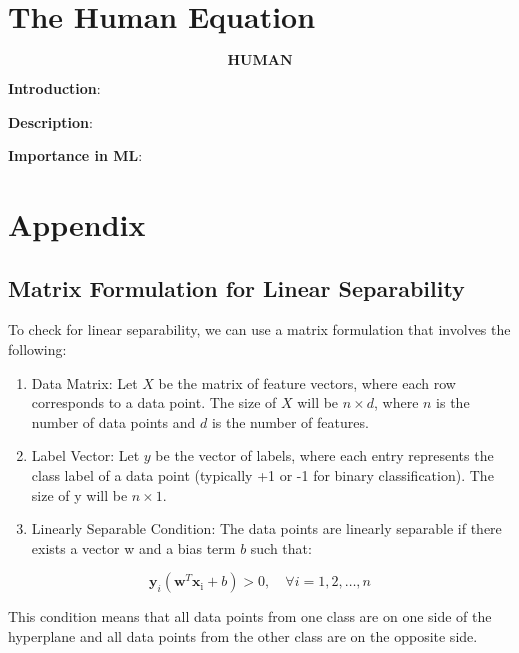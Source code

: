 \documentclass[
  12 pt,
  a4paper,
]{book}
\providecommand{\tightlist}{%
  \setlength{\itemsep}{0pt}\setlength{\parskip}{0pt}}
\numberwithin{equation}{section}
\theoremstyle{plain}      %
\theoremstyle{definition} %
\theoremstyle{remark}     %
\theoremstyle{note}         %
\begin{document}
\newpage

\hypertarget{the-human-equation}{%
\chapter{The Human Equation}\label{the-human-equation}}

\[
\textbf{HUMAN}
\]

\textbf{Introduction}:

\textbf{Description}:

\textbf{Importance in ML}:

\newpage

\backmatter

\hypertarget{appendix}{%
\chapter{Appendix}\label{appendix}}

\hypertarget{matrix-formulation-for-linear-separability}{%
\section*{Matrix Formulation for Linear
Separability}\label{matrix-formulation-for-linear-separability}}

To check for linear separability, we can use a matrix formulation that
involves the following:

\begin{enumerate}
\def\labelenumi{\arabic{enumi}.}
\tightlist
\item
  Data Matrix: Let \(X\) be the matrix of feature vectors, where each
  row corresponds to a data point. The size of \(X\) will be
  \(n \times d\), where \(n\) is the number of data points and \(d\) is
  the number of features.
\item
  Label Vector: Let \(y\) be the vector of labels, where each entry
  represents the class label of a data point (typically +1 or -1 for
  binary classification). The size of y will be \(n \times 1\).
\item
  Linearly Separable Condition: The data points are linearly separable
  if there exists a vector w and a bias term \(b\) such that:
\end{enumerate}

\[
\mathbf{y}_i\left(\mathbf{w}^T \mathbf{x}_{\mathrm{i}}+b\right)>0, \quad \forall i=1,2, \ldots, n
\]

This condition means that all data points from one class are on one side
of the hyperplane and all data points from the other class are on the
opposite side.
\end{document}
